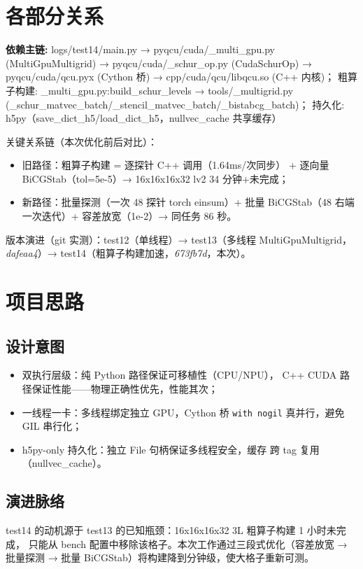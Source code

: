 \documentclass[UTF8]{ctexart}
\begin{document}
\section{各部分关系}
\begin{keybox}
\textbf{依赖主链:} \textcolor{relation}{logs/test14/main.py → pyqcu/cuda/\_multi\_gpu.py
(MultiGpuMultigrid) → pyqcu/cuda/\_schur\_op.py (CudaSchurOp) →
pyqcu/cuda/qcu.pyx (Cython 桥) → cpp/cuda/qcu/libqcu.so (C++ 内核)；
粗算子构建: \_multi\_gpu.py:build\_schur\_levels → tools/\_multigrid.py
(\_schur\_matvec\_batch/\_stencil\_matvec\_batch/\_bistabcg\_batch)；
持久化: h5py（save\_dict\_h5/load\_dict\_h5，nullvec\_cache 共享缓存）}
\end{keybox}

关键关系链（本次优化前后对比）：
\begin{itemize}
\item \textcolor{relation}{旧路径}：粗算子构建 = 逐探针 C++ 调用（1.64ms/次同步）
  + 逐向量 BiCGStab（tol=5e-5）→ 16x16x16x32 lv2 34 分钟+未完成；
\item \textcolor{relation}{新路径}：批量探测（一次 48 探针 torch einsum）+ 批量
  BiCGStab（48 右端一次迭代）+ 容差放宽（1e-2）→ 同任务 86 秒。
\end{itemize}

版本演进（git 实测）：test12（单线程）→ test13（多线程 MultiGpuMultigrid，
\emph{dafeaa4}）→ test14（粗算子构建加速，\emph{673fb7d}，本次）。

\section{项目思路}
\subsection{设计意图}
\begin{itemize}
\item \textcolor{idea}{双执行层级}：纯 Python 路径保证可移植性（CPU/NPU），
  C++ CUDA 路径保证性能——物理正确性优先，性能其次；
\item \textcolor{idea}{一线程一卡}：多线程绑定独立 GPU，Cython 桥 \texttt{with nogil}
  真并行，避免 GIL 串行化；
\item \textcolor{idea}{h5py-only 持久化}：独立 File 句柄保证多线程安全，缓存
  跨 tag 复用（nullvec\_cache）。
\end{itemize}
\subsection{演进脉络}
test14 的动机源于 test13 的已知瓶颈：16x16x16x32 3L 粗算子构建 1 小时未完成，
只能从 bench 配置中移除该格子。本次工作通过三段式优化（容差放宽 → 批量探测 →
批量 BiCGStab）将构建降到分钟级，使大格子重新可测。
\end{document}
